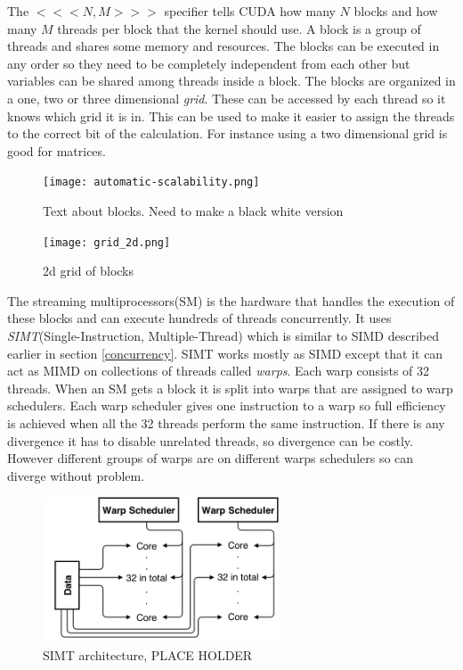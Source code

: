 \documentclass[10pt,a4paper]{report}
\begin{document}
The $<<<N,M>>>$ specifier tells CUDA how many $N$ blocks and how many $M$ threads per block that the kernel should use. A block is a group of threads and shares some memory and resources. The blocks can be executed in any order so they need to be completely independent from each other but variables can be shared among threads inside a block. The blocks are  organized in a one, two or three dimensional \emph{grid}. These can be accessed by each thread so it knows which grid it is in. This can be used to make it easier to assign the threads to the correct bit of the calculation. For instance using a two dimensional grid is good for matrices\cite{cuda, cuda_best_practice}.

\begin{figure}[h]
    \centering
    \texttt{[image: automatic-scalability.png]}
    \caption{Text about blocks. Need to make a black white version}
    \label{fig:blocks_scaling}
\end{figure}

\begin{figure}[h]
    \centering
    \texttt{[image: grid\_2d.png]}
    \caption{2d grid of blocks}
    \label{fig:grid_2d}
\end{figure}

The streaming multiprocessors(SM) is the hardware that handles the execution of these blocks and can execute hundreds of threads concurrently. It uses \emph{SIMT}(Single-Instruction, Multiple-Thread) which is similar to SIMD described earlier in section \ref{concurrency}. SIMT works mostly as SIMD except that it can act as MIMD on collections of threads called \emph{warps}. Each warp consists of 32 threads. When an SM gets a block it is split into warps that are assigned to warp schedulers. Each warp scheduler gives one instruction to a warp so full efficiency is achieved when all the 32 threads perform the same instruction. If there is any divergence it has to disable unrelated threads, so divergence can be costly. However different groups of warps are on different warps schedulers so can diverge without problem.\cite{cuda}

\begin{figure}[h]
    \centering
    \includegraphics[width=7cm]{SIMT.png}
    \caption{SIMT architecture, PLACE HOLDER}
    \label{fig:SIMT}
\end{figure}
\end{document}
